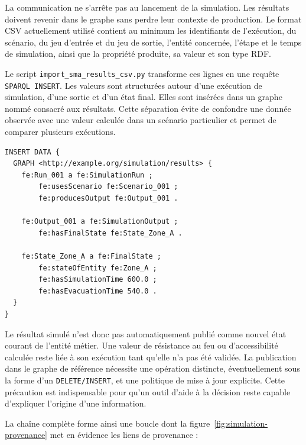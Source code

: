 \documentclass{article}
\begin{document}
La communication ne s'arrête pas au lancement de la simulation. Les résultats doivent revenir dans le graphe sans perdre leur contexte de production. Le format CSV actuellement utilisé contient au minimum les identifiants de l'exécution, du scénario, du jeu d'entrée et du jeu de sortie, l'entité concernée, l'étape et le temps de simulation, ainsi que la propriété produite, sa valeur et son type RDF.

Le script \texttt{import\_sma\_results\_csv.py} transforme ces lignes en une requête \texttt{SPARQL INSERT}. Les valeurs sont structurées autour d'une exécution de simulation, d'une sortie et d'un état final. Elles sont insérées dans un graphe nommé consacré aux résultats. Cette séparation évite de confondre une donnée observée avec une valeur calculée dans un scénario particulier et permet de comparer plusieurs exécutions.

\begin{lstlisting}[language=SPARQL,caption={Insertion historisée d'un résultat de simulation}]
INSERT DATA {
  GRAPH <http://example.org/simulation/results> {
    fe:Run_001 a fe:SimulationRun ;
        fe:usesScenario fe:Scenario_001 ;
        fe:producesOutput fe:Output_001 .

    fe:Output_001 a fe:SimulationOutput ;
        fe:hasFinalState fe:State_Zone_A .

    fe:State_Zone_A a fe:FinalState ;
        fe:stateOfEntity fe:Zone_A ;
        fe:hasSimulationTime 600.0 ;
        fe:hasEvacuationTime 540.0 .
  }
}
\end{lstlisting}

Le résultat simulé n'est donc pas automatiquement publié comme nouvel état courant de l'entité métier. Une valeur de résistance au feu ou d'accessibilité calculée reste liée à son exécution tant qu'elle n'a pas été validée. La publication dans le graphe de référence nécessite une opération distincte, éventuellement sous la forme d'un \texttt{DELETE/INSERT}, et une politique de mise à jour explicite. Cette précaution est indispensable pour qu'un outil d'aide à la décision reste capable d'expliquer l'origine d'une information.

La chaîne complète forme ainsi une boucle dont la figure~\ref{fig:simulation-provenance} met en évidence les liens de provenance :
\end{document}
